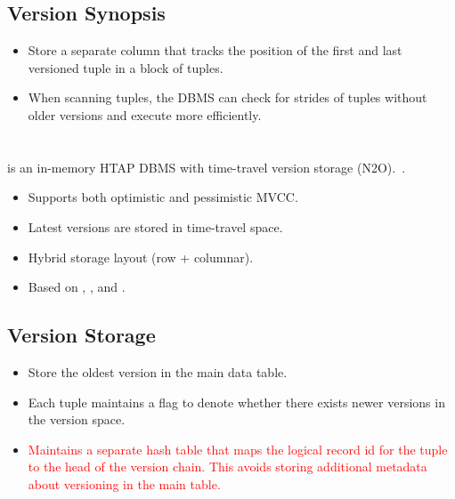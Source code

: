 \documentclass[11pt]{article}
\newcommand{\rr}[1]{\textcolor{red}{#1}}
\begin{document}
\subsection*{Version Synopsis}
\begin{itemize}
    \item
    Store a separate column that tracks the position of the first and last versioned tuple in 
    a block of tuples.

    \item
    When scanning tuples, the DBMS can check for strides of tuples without older versions and 
    execute more efficiently.
\end{itemize}


\section{}
 is an in-memory HTAP DBMS with time-travel version storage (N2O).~\cite{farber2012sap}.
\begin{itemize}
    \item Supports both optimistic and pessimistic MVCC.
    \item Latest versions are stored in time-travel space.
    \item Hybrid storage layout (row + columnar).
    \item Based on , , and .
\end{itemize}

\subsection*{Version Storage}
\begin{itemize}
    \item 
    Store the oldest version in the main data table.
    
    \item 
    Each tuple maintains a flag to denote whether there exists newer versions in the version space. 
    
    \item \rr{Maintains a separate hash table that maps the logical record id for the tuple to the head of the version chain. This avoids storing additional metadata about versioning in the main table.}
\end{itemize}
\end{document}
